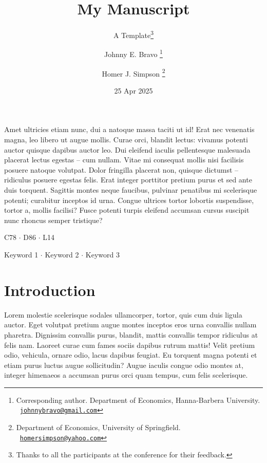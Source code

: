 \documentclass[
12pt,
a4paper,
twoside,
]{article}
\title{My Manuscript}
\subtitle{A Template\footnote{Thanks to all the participants at the
  conference for their feedback.}}
\author{
Johnny E. Bravo%
\thanks{Corresponding author. Department of Economics, Hanna-Barbera
University.
\\ \faEnvelopeO \ \href{mailto:johnnybravo@gmail.com}{\nolinkurl{johnnybravo@gmail.com}}}
 \and %
Homer J. Simpson%
\thanks{Department of Economics, University of Springfield.
\\ \faEnvelopeO \ \href{mailto:homersimpson@yahoo.com}{\nolinkurl{homersimpson@yahoo.com}}}
}
\date{25 Apr 2025}
\makeatletter
\renewenvironment{abstract}{%
\if@twocolumn
    \section*{\abstractname}%
\else
    \normalsize
    \begin{center}%
      {\sffamily\fontseries{sb}\scshape \abstractname\vspace{-.5em}\vspace{\z@}}%
    \end{center}%
\fi}
\makeatother
\begin{document}

\maketitle

\thispagestyle{empty}

\begin{abstract}
  \quotation
  \small \selectfont \noindent Amet ultricies etiam nunc, dui a natoque
massa taciti ut id! Erat nec venenatis magna, leo libero ut augue
mollis. Curae orci, blandit lectus: vivamus potenti auctor quisque
dapibus auctor leo. Dui eleifend iaculis pellentesque malesuada placerat
lectus egestas -- cum nullam. Vitae mi consequat mollis nisi facilisis
posuere natoque volutpat. Dolor fringilla placerat non, quisque dictumst
-- ridiculus posuere egestas felis. Erat integer porttitor pretium purus
et sed ante duis torquent. Sagittis montes neque faucibus, pulvinar
penatibus mi scelerisque potenti; curabitur inceptos id urna. Congue
ultrices tortor lobortis suspendisse, tortor a, mollis facilisi? Fusce
potenti turpis eleifend accumsan cursus suscipit nunc rhoncus semper
tristique?
      \vspace{1ex}
  \begin{description}[font=\sffamily\fontseries{sb}\scshape, itemsep=1ex]
    \item[JEL Classification:]  C78  \( \cdot \)  D86  \( \cdot \)  L14 
    \item[Keywords:]  Keyword 1  \( \cdot \)  Keyword
2  \( \cdot \)  Keyword 3 
  \end{description}
      \endquotation
\end{abstract}


\clearpage

\section{Introduction}\label{introduction}

Lorem molestie scelerisque sodales ullamcorper, tortor, quis cum duis
ligula auctor. Eget volutpat pretium augue montes inceptos eros urna
convallis nullam pharetra. Dignissim convallis purus, blandit, mattis
convallis tempor ridiculus at felis nam. Laoreet curae cum fames sociis
dapibus rutrum mattis! Velit pretium odio, vehicula, ornare odio, lacus
dapibus feugiat. Eu torquent magna potenti et etiam purus luctus augue
sollicitudin? Augue iaculis congue odio montes at, integer himenaeos a
accumsan purus orci quam tempus, cum felis scelerisque.
\end{document}
